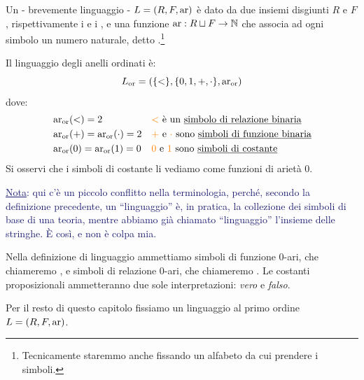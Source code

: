 \begin{definition}
    Un  - brevemente linguaggio - $L = (R,F,\operatorname{ar})$ è dato da due insiemi disgiunti $R$ e $F$, rispettivamente i  e i , e una funzione
    $\operatorname{ar} : R \sqcup F \to \mathbb N$ che associa ad ogni simbolo un numero naturale, detto .\footnote{Tecnicamente staremmo anche fissando un alfabeto da cui prendere i simboli.}
\end{definition}

\begin{example}
    Il linguaggio degli anelli ordinati è:
    \[ L_{\text{\text{or}}} = (\{<\},\{0,1,+,\cdot\},\operatorname{ar}_{\text{or}})
    \]
    dove:
    \begin{align*}
        &\operatorname{ar}_{\text{or}}(<) = 2 &&\text{\textcolor{orange}{$<$} è un \underline{simbolo di relazione binaria}} \\
        &\operatorname{ar}_{\text{or}}(+) = \operatorname{ar}_{\text{or}}(\cdot) = 2 &&\text{\textcolor{orange}{+} e \textcolor{orange}{$\cdot$} sono \underline{simboli di funzione binaria}} \\
        &\operatorname{ar}_{\text{or}}(0) = \operatorname{ar}_{\text{or}}(1) = 0 &&\text{\textcolor{orange}{0} e \textcolor{orange}{1} sono \underline{simboli di costante}}
    \end{align*}
    Si osservi che i simboli di costante li vediamo come funzioni di arietà 0.
\end{example}

\textcolor{MidnightBlue}{\underline{Nota}: qui c'è un piccolo conflitto nella terminologia, perché, secondo la definizione precedente, un ``linguaggio'' è, in pratica, la collezione dei simboli di base
di una teoria, mentre abbiamo già chiamato ``linguaggio'' l'insieme delle stringhe. È così, e non è colpa mia.}

\begin{remark}
    Nella definizione di linguaggio ammettiamo simboli di funzione 0-ari, che chiameremo , e simboli di relazione 0-ari, che chiameremo .
    Le costanti proposizionali ammetteranno due sole interpretazioni: \emph{vero} e \emph{falso}.
\end{remark}

Per il resto di questo capitolo fissiamo un linguaggio al primo ordine $L = (R,F,\operatorname{ar})$.

